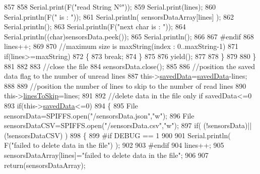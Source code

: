 \begin{DoxyCode}
857      
858                 Serial.print(F(\textcolor{stringliteral}{"read String N°"}));
859                 Serial.print(lines);
860                 Serial.println(F(\textcolor{stringliteral}{" is : "}));
861                 Serial.println( sensorsDataArray[lines] );
862                 Serial.println();
863                 Serial.println(F(\textcolor{stringliteral}{"next char is : "}));
864                 Serial.println((\textcolor{keywordtype}{char})sensorsData.peek());
865                 Serial.println();           
866             
867 \textcolor{preprocessor}{            #endif}
868                 lines++;
869             
870                 \textcolor{comment}{//maximum size is maxString(index : 0..maxString-1)}
871                 \textcolor{keywordflow}{if}(lines>=maxString)
872                 \{
873                     \textcolor{keywordflow}{break};
874                 \}
875             
876                 yield();
877             
878             \}
879 
880         \}
881         
882                     
883         \textcolor{comment}{//close the file}
884         sensorsData.close();
885 
886         \textcolor{comment}{//position the saved data flag to the number of unread lines}
887         this->\hyperlink{class_cool_file_system_ad9f5b739a32100f5f21270c3d9ee2b1d}{savedData}=\hyperlink{class_cool_file_system_ad9f5b739a32100f5f21270c3d9ee2b1d}{savedData}-lines;
888         
889         \textcolor{comment}{//position the number of lines to skip to the number of read lines  }
890         this->\hyperlink{class_cool_file_system_a84fdb6057e534b395512463daa28ea3c}{linesToSkip}=lines;
891 
892         \textcolor{comment}{//delete data in the file only if savedData<=0}
893         \textcolor{keywordflow}{if}(this->\hyperlink{class_cool_file_system_ad9f5b739a32100f5f21270c3d9ee2b1d}{savedData}<=0)
894         \{
895             File sensorsData=SPIFFS.open(\textcolor{stringliteral}{"/sensorsData.json"},\textcolor{stringliteral}{"w"});
896             File sensorsDataCSV=SPIFFS.open(\textcolor{stringliteral}{"/sensorsData.csv"},\textcolor{stringliteral}{"w"});
897             \textcolor{keywordflow}{if}( (!sensorsData)||(!sensorsDataCSV) ) 
898             \{
899 \textcolor{preprocessor}{            #if DEBUG == 1}
900     
901                 Serial.println( F(\textcolor{stringliteral}{"failed to delete data in the file"}) );
902     
903 \textcolor{preprocessor}{            #endif}
904                 lines++;
905                 sensorsDataArray[lines]=\textcolor{stringliteral}{"failed to delete data in the file"};
906 
907                 \textcolor{keywordflow}{return}(sensorsDataArray);

\end{DoxyCode}
